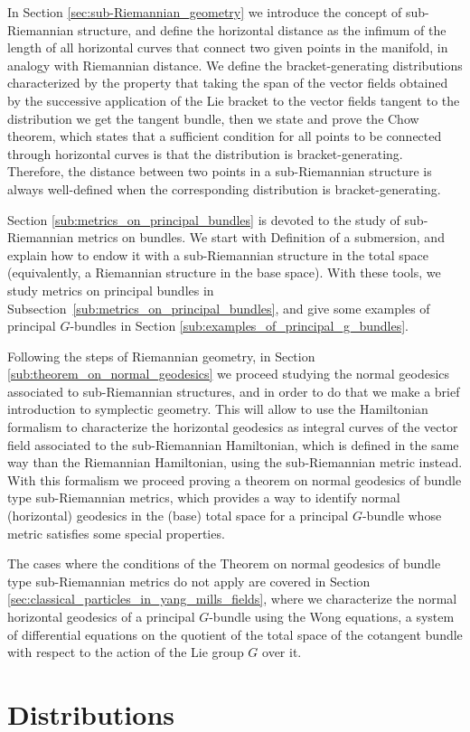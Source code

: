 \documentclass[12pt, letterpaper, reqno]{amsart}
\theoremstyle{definition}
\theoremstyle{plain}
\theoremstyle{remark}
\begin{document}
In Section \ref{sec:sub-Riemannian_geometry} we introduce the concept of sub-Riemannian structure, and define the horizontal distance as the infimum of the length of all horizontal curves that connect two given points in the manifold, in analogy with Riemannian distance. We define the bracket-generating distributions characterized by the property that taking the span of the vector fields obtained by the successive application of the Lie bracket to the vector fields tangent to the distribution we get the tangent bundle, then we state and prove the Chow theorem, which states that a sufficient condition for all points to be connected through horizontal curves is that the distribution is bracket-generating. Therefore, the distance between two points in a sub-Riemannian structure is always well-defined when the corresponding distribution is bracket-generating. 

Section \ref{sub:metrics_on_principal_bundles} is devoted to the study of sub-Riemannian metrics on bundles.
We start with Definition of a submersion, and explain how to endow it with a sub-Riemannian structure in the total space (equivalently, a Riemannian structure in the base space). With these tools, we study metrics on principal bundles in Subsection~\ref{sub:metrics_on_principal_bundles}, and give some examples of principal $ G $-bundles in Section \ref{sub:examples_of_principal_g_bundles}. 

Following the steps of Riemannian geometry, in Section \ref{sub:theorem_on_normal_geodesics} we proceed studying the normal geodesics associated to sub-Riemannian structures, and in order to do that we make a brief introduction to symplectic geometry. This will allow to use the Hamiltonian formalism to characterize the horizontal geodesics as integral curves of the vector field associated to the sub-Riemannian Hamiltonian, which is defined in the same way than the Riemannian Hamiltonian, using the sub-Riemannian metric instead. With this formalism we proceed proving a theorem on normal geodesics of bundle type sub-Riemannian metrics, which provides a way to identify normal (horizontal) geodesics in the (base) total space for a principal $ G $-bundle whose metric satisfies some special properties.

The cases where the conditions of the Theorem on normal geodesics of bundle type sub-Riemannian metrics do not apply are covered in Section \ref{sec:classical_particles_in_yang_mills_fields}, where we characterize the normal horizontal geodesics of a principal $ G $-bundle using the Wong equations, a system of differential equations on the quotient of the total space of the cotangent bundle with respect to the action of the Lie group $ G $ over it.\section{Distributions}
\label{sec:1}
\end{document}
